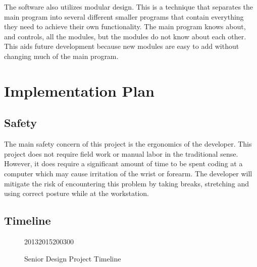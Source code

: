 \documentclass[12pt]{article}
\begin{document}
The software also utilizes modular design. This is a technique that separates the main program into several different smaller programs that contain everything they need to achieve their own functionality. The main program knows about, and controls, all the modules, but the modules do not know about each other. This aids future development because new modules are easy to add without changing much of the main program.

\section{Implementation Plan}
\subsection{Safety}

The main safety concern of this project is the ergonomics of the developer. This project does not require field work or manual labor in the traditional sense. However, it does require a significant amount of time to be spent coding at a computer which may cause irritation of the wrist or forearm. The developer will mitigate the risk of encountering this problem by taking breaks, stretching and using correct posture while at the workstation.

\subsection{Timeline}

\begin{figure}[H]

\begin{timeline}{2013}{2015}{200}{300}
  
  
\end{timeline}
\caption{Senior Design Project Timeline}
\end{figure}
\end{document}
